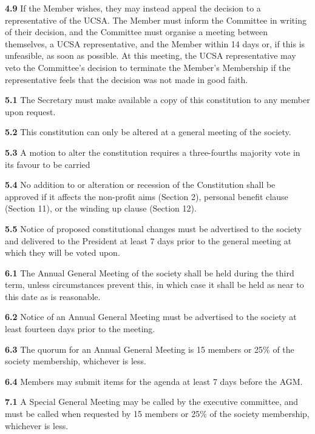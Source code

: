 \textbf{4.9} If the Member wishes, they may instead appeal the decision to a representative of the UCSA. The Member must inform the Committee in writing of their decision, and the Committee must organise a meeting between themselves, a UCSA representative, and the Member within 14 days or, if this is unfeasible, as soon as possible. At this meeting, the UCSA representative may veto the Committee's decision to terminate the Member's Membership if the representative feels that the decision was not made in good faith.

\vspace{1em}

\textbf{5.1} The Secretary must make available a copy of this constitution to any member upon request.

\textbf{5.2} This constitution can only be altered at a general meeting of the society.

\textbf{5.3} A motion to alter the constitution requires a three-fourths majority vote in its favour to be carried

\textbf{5.4} No addition to or alteration or recession of the Constitution shall be approved if it affects the non-profit aims (Section 2), personal benefit clause (Section 11), or the winding up clause (Section 12).

\textbf{5.5} Notice of proposed constitutional changes must be advertised to the society and delivered to the President at least 7 days prior to the general meeting at which they will be voted upon.

\vspace{1em}

\textbf{6.1} The Annual General Meeting of the society shall be held during the third term, unless circumstances prevent this, in which case it shall be held as near to this date as is reasonable.

\textbf{6.2} Notice of an Annual General Meeting must be advertised to the society at least fourteen days prior to the meeting.

\textbf{6.3} The quorum for an Annual General Meeting is 15 members or 25\% of the society membership, whichever is less.

\textbf{6.4} Members may submit items for the agenda at least 7 days before the AGM. 

\vspace{1em}

\textbf{7.1} A Special General Meeting may be called by the executive committee, and must be called when requested by 15 members or 25\% of the society membership, whichever is less.

